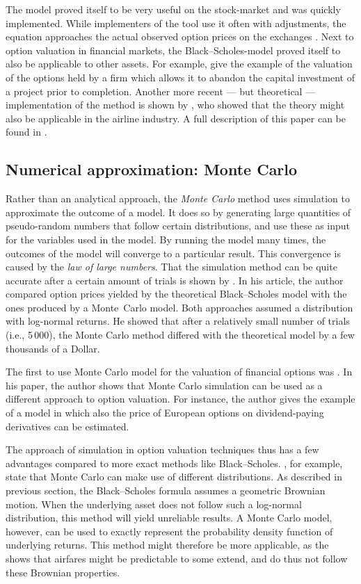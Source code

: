 The model proved itself to be very useful on the stock-market and was quickly implemented. While implementers of the tool use it often with adjustments, the equation approaches the actual observed option prices on the exchanges \cite{bodie2008investments}. 
Next to option valuation in financial markets, the Black--Scholes-model proved itself to also be applicable to other assets. For example,  give the example of the valuation of the options held by a firm which allows it to abandon the capital investment of a project prior to completion. Another more recent --- but theoretical --- implementation of the method is shown by , who showed that the theory might also be applicable in the airline industry. A full description of this paper can be found in .


\subsection{Numerical approximation: Monte Carlo}
Rather than an analytical approach, the \emph{Monte Carlo} method uses simulation to approximate the outcome of a model. It does so by generating large quantities of pseudo-random numbers that follow certain distributions, and use these as input for the variables used in the model.  By running the model many times, the outcomes of the model will converge to a particular result. This convergence is caused by the \emph{law of large numbers}. That the simulation method can be quite accurate after a certain amount of trials is shown by . In his article, the author compared option prices yielded by the theoretical Black--Scholes model with the ones produced by a Monte~Carlo model. Both approaches assumed a distribution with log-normal returns. He showed that after a relatively small number of trials (i.e., 5\,000), the Monte Carlo method differed with the theoretical model by a few thousands of a Dollar.

The first to use Monte Carlo model for the valuation of financial options was . In his paper, the author shows that Monte Carlo simulation can be used as a different approach to option valuation. For instance, the author gives the example of a model in which also the price of European options on dividend-paying derivatives can be estimated.

The approach of simulation in option valuation techniques thus has a few advantages compared to more exact methods like Black--Scholes. , for example, state that Monte Carlo can make use of different distributions. As described in previous section, the Black--Scholes formula assumes a geometric Brownian motion. When the underlying asset does not follow such a log-normal distribution, this method will yield unreliable results. A Monte Carlo model, however, can be used to exactly represent the probability density function of underlying returns. This method might therefore be more applicable, as the  shows that airfares might be predictable to some extend, and do thus not follow these Brownian properties.

